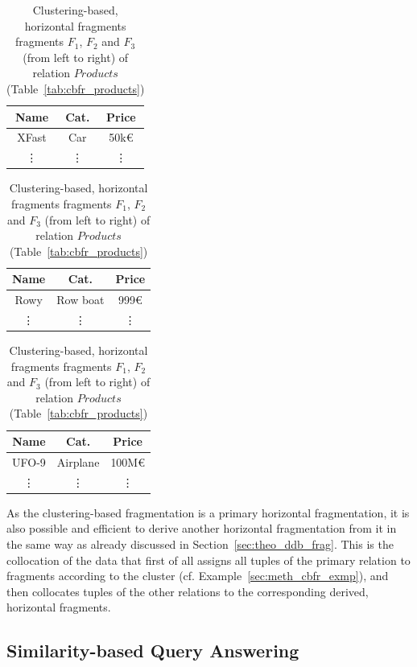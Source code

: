 \begin{exmp}
\begin{table}[h]
    \hspace*{\fill}
    \begin{tabular}{|c|c|c|}
        \hline
        Name & Cat. & Price \\
        \hline
        XFast & Car & 50k€ \\
        \vdots & \vdots & \vdots \\
        \hline
    \end{tabular}
    \hfill
    \begin{tabular}{|c|c|c|}
        \hline
        Name & Cat. & Price\\
        \hline
        Rowy & Row boat & 999€ \\
        \vdots & \vdots & \vdots \\
        \hline
    \end{tabular}
    \hfill
    \begin{tabular}{|c|c|c|}
        \hline
        Name & Cat. & Price\\
        \hline
        UFO-9 & Airplane & 100M€ \\
        \vdots & \vdots & \vdots \\
        \hline
    \end{tabular}
    \hspace*{\fill}
    \caption{Clustering-based, horizontal fragments fragments $F_1$, $F_2$ and $F_3$ (from left to right) of relation $Products$ 
            (Table~\ref{tab:cbfr_products})}
    \label{tab:cbfr_frags}
\end{table}

\end{exmp}

As the clustering-based fragmentation is a primary horizontal fragmentation, it is also possible and efficient to derive another horizontal fragmentation
from it in the same way as already discussed in Section~\ref{sec:theo_ddb_frag}. This is the collocation of the data that first of all assigns all tuples
of the primary relation to fragments according to the cluster (cf. Example~\ref{sec:meth_cbfr_exmp}), and then collocates tuples of the other relations to
the corresponding derived, horizontal fragments.


\subsection{Similarity-based Query Answering}
\label{sec:meth_sbqa}

